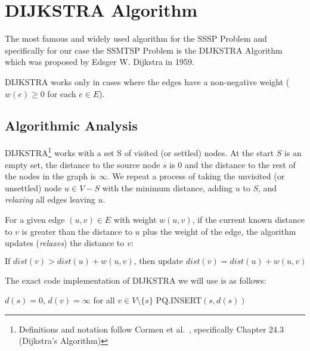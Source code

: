 \section{DIJKSTRA Algorithm}
The most famous and widely used algorithm for the SSSP Problem and specifically for our case the SSMTSP Problem is the \textsc{DIJKSTRA} Algorithm\cite{dijkstraNoteTwoProblems1959} which was proposed by Edsger W. Dijkstra in 1959. 

\textsc{DIJKSTRA} works only in cases where the edges have a non-negative weight ($w(e) \ge 0$ for each $e \in E$). 

\subsection{Algorithmic Analysis}
\textsc{DIJKSTRA}\footnote{Definitions and notation follow Cormen et al.~\cite[Ch.~24.3]{cormenIntroductionAlgorithms2009}, specifically Chapter 24.3 (Dijkstra's Algorithm)} works with a set S of visited (or settled) nodes. 
At the start $S$ is an empty set, the distance to the source node $s$ is 0 and the distance to the rest of the nodes in the graph is $\infty$.
We repeat a process of taking the unvisited (or unsettled) node $u \in V-S$ with the minimum distance, adding $u$ to $S$, and \textit{relaxing} all edges leaving $u$. 

For a given edge $(u, v) \in E$ with weight $w(u, v)$, if the current known distance to $v$ is greater than the distance to $u$ plus the weight of the edge, 
the algorithm updates (\textit{relaxes}) the distance to $v$:

\begin{equation}
\text{If } dist(v) > dist(u) + w(u, v) \text{, then update } dist(v) = dist(u) + w(u, v)
\end{equation}

The exact code implementation of \textsc{DIJKSTRA} we will use is as follows:
\begin{algorithm}[H]
\caption{DIJKSTRA (G, w, s, T)}
$d(s) = 0$, $d(v) = \infty$ for all $v \in V \setminus \{s\}$ 
PQ.INSERT$(s, d(s))$\;
\end{algorithm}

\begin{algorithm}[H]
\caption{RELAX(u, v, tent)}
\end{algorithm}

